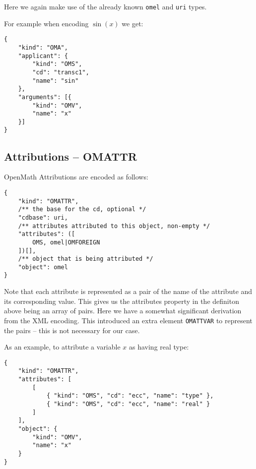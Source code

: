 Here we again make use of the already known \texttt{omel} and \texttt{uri} types. 

For example when encoding $\sin(x)$ we get:
\\\begin{minipage}{\linewidth}
\begin{lstlisting}
{
    "kind": "OMA",
    "applicant": {
        "kind": "OMS",
        "cd": "transc1",
        "name": "sin"
    },
    "arguments": [{
        "kind": "OMV",
        "name": "x"
    }]
}
\end{lstlisting}\end{minipage}

\subsection{Attributions -- OMATTR}

OpenMath Attributions are encoded as follows:
\\\begin{minipage}{\linewidth}
\begin{lstlisting}
{
    "kind": "OMATTR", 
    /** the base for the cd, optional */
    "cdbase": uri, 
    /** attributes attributed to this object, non-empty */
    "attributes": ([
        OMS, omel|OMFOREIGN
    ])[],
    /** object that is being attributed */
    "object": omel
}
\end{lstlisting}\end{minipage}

Note that each attribute is represented as a pair of the name of the attribute and its corresponding value. 
This gives us the attributes property in the definiton above being an array of pairs. 
Here we have a somewhat significant derivation from the XML encoding. 
This introduced an extra element \texttt{OMATTVAR} to represent the pairs -- this is not necessary for our case. 

As an example, to attribute a variable $x$ as having real type:
\\\begin{minipage}{\linewidth}
\begin{lstlisting}
{
    "kind": "OMATTR",
    "attributes": [
        [
            { "kind": "OMS", "cd": "ecc", "name": "type" },
            { "kind": "OMS", "cd": "ecc", "name": "real" }
        ]
    ],
    "object": {
        "kind": "OMV",
        "name": "x"
    }
}
\end{lstlisting}\end{minipage}

